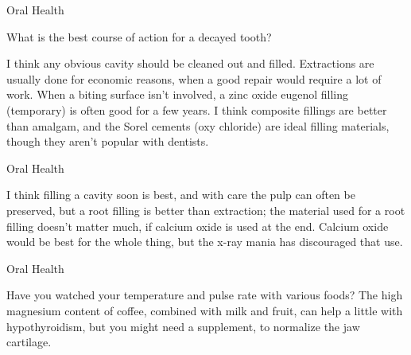 \documentclass[11pt,oneside,openany,extrafontsizes]{memoir}
\begin{document}
\begin{qaexchange}{Oral Health}

    \begin{question}
        What is the best course of action for a decayed tooth?
    \end{question}

    \begin{answer}
        I think any obvious cavity should be cleaned out and filled. Extractions are usually done for economic reasons, when a good repair would require a lot of work. When a biting surface isn't involved, a zinc oxide eugenol filling (temporary) is often good for a few years. I think composite fillings are better than amalgam, and the Sorel cements (oxy chloride) are ideal filling materials, though they aren't popular with dentists.
    \end{answer}
\end{qaexchange}

\begin{standalonequote}{Oral Health}

    \begin{answer}
        I think filling a cavity soon is best, and with care the pulp can often be preserved, but a root filling is better than extraction; the material used for a root filling doesn't matter much, if calcium oxide is used at the end. Calcium oxide would be best for the whole thing, but the x-ray mania has discouraged that use.
    \end{answer}
\end{standalonequote}

\begin{standalonequote}{Oral Health}

    \begin{answer}
        Have you watched your temperature and pulse rate with various foods? The high magnesium content of coffee, combined with milk and fruit, can help a little with hypothyroidism, but you might need a supplement, to normalize the jaw cartilage.
    \end{answer}
\end{standalonequote}
\end{document}
